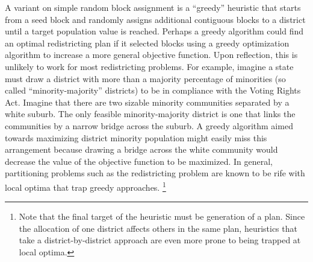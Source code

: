 \documentclass[article]{JSSstyle/jss}
\begin{document}
A variant on simple random block assignment is a ``greedy'' 
heuristic that starts from a seed block and randomly assigns 
additional contiguous blocks to a district until a target population 
value is reached. Perhaps a greedy algorithm could find an optimal redistricting plan 
if it selected blocks using a greedy optimization algorithm 
to increase a more general objective function.  Upon reflection, this is unlikely to  
 work for most redistricting problems.  For example, imagine a state must draw a district 
with more than a majority percentage of minorities 
(so called ``minority-majority'' districts) to be in 
compliance with the Voting Rights Act.  Imagine that there are two 
sizable minority communities separated by a white 
suburb.  The only feasible minority-majority district is one that 
links the communities by a narrow bridge across the suburb.  A 
greedy algorithm aimed towards maximizing district minority 
population might easily miss this arrangement because  
drawing a bridge across the white community would decrease the value of the objective
function to be maximized. In general, partitioning problems such as the redistricting problem are known to be rife with local optima that trap greedy approaches. \footnote{Note that the final target of the heuristic must be generation of a plan. Since the allocation of one district affects others in the same plan, heuristics that take a district-by-district approach are even more prone to being trapped at local optima. }


\end{document}
